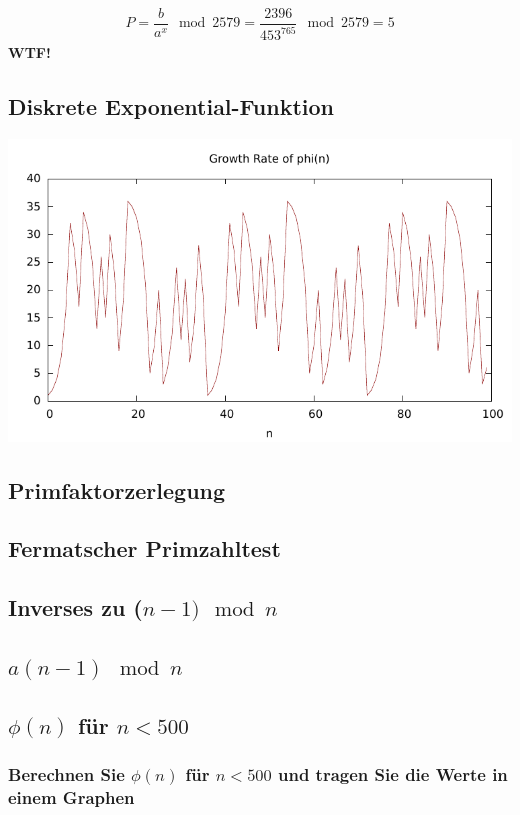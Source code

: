 {\begin{align}
	P = \dfrac{b}{a^x} \mod 2579= \dfrac{2396}{453^{765}} \mod 2579 = 5 
\end{align}
\textbf{WTF!}

\subsection{Diskrete Exponential-Funktion}


\includegraphics[scale=1]{eclipse/expofun.pdf}

\subsection{Primfaktorzerlegung}
\subsection{Fermatscher Primzahltest}
\subsection{Inverses zu ($n-1) \mod n$}
\subsection{$a(n-1) \mod n$}
\subsection{$\phi(n)$ für $n < 500$}

\subsubsection{Berechnen Sie $\phi(n)$ für $n < 500$ und tragen Sie die Werte in einem Graphen}

}
